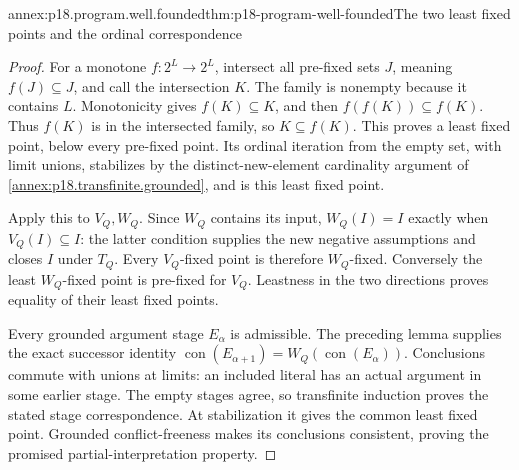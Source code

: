\begin{annexitem}{annex:p18.program.well.founded}{thm:p18-program-well-founded}{The two least fixed points and the ordinal correspondence}
\begin{proof}
For a monotone \(f:2^L\to2^L\), intersect all pre-fixed
sets \(J\), meaning \(f(J)\subseteq J\), and call
the intersection \(K\). The family is nonempty
because it contains \(L\). Monotonicity gives
\(f(K)\subseteq K\), and then
\(f(f(K))\subseteq f(K)\). Thus \(f(K)\)
is in the intersected family, so \(K\subseteq f(K)\).
This proves a least fixed point, below every
pre-fixed point. Its ordinal iteration from
the empty set, with limit unions, stabilizes
by the distinct-new-element cardinality argument
of \cref{annex:p18.transfinite.grounded}, and
is this least fixed point.

Apply this to \(V_Q,W_Q\). Since \(W_Q\)
contains its input, \(W_Q(I)=I\) exactly
when \(V_Q(I)\subseteq I\): the latter
condition supplies the new negative assumptions
and closes \(I\) under \(T_Q\).
Every \(V_Q\)-fixed point is therefore
\(W_Q\)-fixed. Conversely the least
\(W_Q\)-fixed point is pre-fixed for
\(V_Q\). Leastness in the two directions
proves equality of their least fixed points.

Every grounded argument stage \(E_\alpha\)
is admissible. The preceding lemma supplies
the exact successor identity
\(\operatorname{con}(E_{\alpha+1})
=W_Q(\operatorname{con}(E_\alpha))\).
Conclusions commute with unions at limits:
an included literal has an actual argument
in some earlier stage. The empty stages
agree, so transfinite induction proves
the stated stage correspondence. At
stabilization it gives the common least
fixed point. Grounded conflict-freeness
makes its conclusions consistent, proving
the promised partial-interpretation property.
\end{proof}
\end{annexitem}

